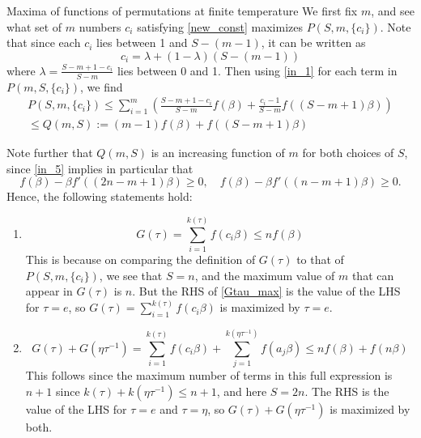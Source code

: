 \documentclass[a4paper,11pt]{article}
\newcommand{\be}{\begin{equation}}
\newcommand{\ee}{\end{equation}}
\begin{document}
\begin{enumerate}
\begin{appendix}
\begin{section}{Maxima of functions of permutations at finite temperature}
We first fix $m$, and see what set of $m$ numbers $c_i$ satisfying \eqref{new_const} maximizes $P(S, m, \{c_i\})$. Note that since each $c_i$ lies between 1 and $S - (m-1)$, it can be written as 
\be 
c_i = \lambda + (1-\lambda) (S-(m-1))
\ee
where $\lambda =\frac{S-m+1-c_i}{S-m}$ lies between 0 and 1. Then using \eqref{in_1} for each term in $P(m, S, \{c_i\})$, we find 
\be 
\begin{gathered} 
P(S, m, \{ c_i \}) \leq \sum_{i=1}^m \left( \frac{S-m+1-c_i}{S-m} f( \beta) + \frac{c_i-1}{S-m} f\left((S-m+1)\beta\right) \right)\\
 \leq Q(m, S):= (m-1)f(\beta) + f\left((S-m +1)\beta \right) 
\end{gathered}
\label{P_eq}
\ee

Note further that $Q(m, S)$ is an increasing function of $m$ for both choices of $S$, since \eqref{in_5} implies in particular that 
\be 
f(\beta) - \beta f'((2n-m+1)\beta)\geq 0, \quad f(\beta) - \beta f'((n-m+1)\beta) \geq 0. 
\ee
Hence, the following statements hold: 
\begin{enumerate} 
\item 
\be 
G(\tau) = \sum_{i=1}^{k(\tau)} f(c_i \beta) \leq n f(\beta) \label{Gtau_max}
\ee
This is because on comparing the definition of $G(\tau)$ to that of $P(S, m, \{c_i\})$, we see that $S=n$, and the maximum value of $m$ that can appear in $G(\tau)$ is $n$. But the RHS of \eqref{Gtau_max} is the value of the LHS for $\tau=e$, so $G(\tau)= \sum_{i=1}^{k(\tau)} f(c_i \beta)$ is maximized by $\tau=e$. 
\item 
\be 
G(\tau) + G(\eta\tau^{-1}) =\sum_{i=1}^{k(\tau)} f(c_i \beta) + \sum_{j=1}^{k(\eta \tau^{-1})} f(a_j \beta) \leq n f(\beta) +f(n\beta)
\ee
This follows since the maximum number of terms in this full expression is $n+1$ since $k(\tau) + k(\eta \tau^{-1})\leq n+1$, and here $S=2n$. The RHS is the value of the LHS for $\tau=e$ and $\tau=\eta$, so $G(\tau)+ G(\eta \tau^{-1})$ is maximized by both. 


\end{enumerate}
\end{section}
\end{appendix}
\end{enumerate}
\end{document}
